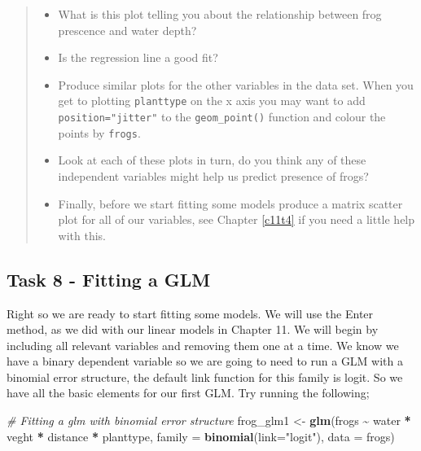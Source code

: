 \documentclass[
]{book}
\newenvironment{Shaded}{\begin{snugshade}}{\end{snugshade}}
\newcommand{\AttributeTok}[1]{\textcolor[rgb]{0.13,0.29,0.53}{#1}}
\newcommand{\CommentTok}[1]{\textcolor[rgb]{0.56,0.35,0.01}{\textit{#1}}}
\newcommand{\FunctionTok}[1]{\textcolor[rgb]{0.13,0.29,0.53}{\textbf{#1}}}
\newcommand{\NormalTok}[1]{#1}
\newcommand{\OtherTok}[1]{\textcolor[rgb]{0.56,0.35,0.01}{#1}}
\newcommand{\SpecialCharTok}[1]{\textcolor[rgb]{0.81,0.36,0.00}{\textbf{#1}}}
\newcommand{\StringTok}[1]{\textcolor[rgb]{0.31,0.60,0.02}{#1}}
\providecommand{\tightlist}{%
  \setlength{\itemsep}{0pt}\setlength{\parskip}{0pt}}
\begin{document}
\begin{quote}
\begin{itemize}
\tightlist
\item
  What is this plot telling you about the relationship between frog prescence and water depth?
\item
  Is the regression line a good fit?
\item
  Produce similar plots for the other variables in the data set. When you get to plotting \texttt{planttype} on the x axis you may want to add \texttt{position="jitter"} to the \texttt{geom\_point()} function and colour the points by \texttt{frogs}.
\item
  Look at each of these plots in turn, do you think any of these independent variables might help us predict presence of frogs?
\item
  Finally, before we start fitting some models produce a matrix scatter plot for all of our variables, see Chapter \ref{c11t4} if you need a little help with this.
\end{itemize}
\end{quote}

\hypertarget{task-8---fitting-a-glm}{%
\subsection{Task 8 - Fitting a GLM}\label{task-8---fitting-a-glm}}

Right so we are ready to start fitting some models. We will use the Enter method, as we did with our linear models in Chapter 11. We will begin by including all relevant variables and removing them one at a time. We know we have a binary dependent variable so we are going to need to run a GLM with a binomial error structure, the default link function for this family is logit. So we have all the basic elements for our first GLM. Try running the following;

\begin{Shaded}
\begin{Highlighting}[]
\CommentTok{\# Fitting a glm with binomial error structure}
\NormalTok{frog\_glm1 }\OtherTok{\textless{}{-}} \FunctionTok{glm}\NormalTok{(frogs }\SpecialCharTok{\textasciitilde{}}\NormalTok{ water }\SpecialCharTok{*}\NormalTok{ veght }\SpecialCharTok{*}\NormalTok{ distance }\SpecialCharTok{*}\NormalTok{ planttype,}
                 \AttributeTok{family =} \FunctionTok{binomial}\NormalTok{(}\AttributeTok{link=}\StringTok{"logit"}\NormalTok{),}
                 \AttributeTok{data =}\NormalTok{ frogs)}
\end{Highlighting}
\end{Shaded}
\end{document}
